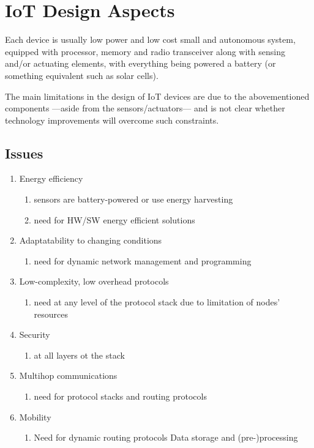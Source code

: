\chapter{IoT Design Aspects}
Each device is usually low power and low cost small and autonomous system, equipped with processor, memory and radio transceiver along with sensing and/or actuating elements, with everything being powered a battery (or something equivalent such as solar cells).

The main limitations in the design of IoT devices are due to the abovementioned components ---aside from the sensors/actuators--- and is not clear whether technology improvements will overcome such constraints.  

\section{Issues}
\begin{enumerate}
   \item Energy efficiency
   \begin{enumerate}
      \item sensors are battery-powered or use energy
      harvesting
      \item need for HW/SW energy efficient solutions
   \end{enumerate}
   \item Adaptatability to changing conditions
   \begin{enumerate}
      \item need for dynamic network management and programming
   \end{enumerate}
   \item Low-complexity, low overhead protocols
   \begin{enumerate}
      \item need at any level of the protocol stack due
      to limitation of nodes’ resources
   \end{enumerate}
   \item Security
   \begin{enumerate}
      \item at all layers ot the stack
   \end{enumerate}
   \item Multihop communications
   \begin{enumerate}
      \item need for protocol stacks and routing
      protocols
   \end{enumerate}
   \item Mobility
   \begin{enumerate}
      \item Need for dynamic routing protocols
      Data storage and (pre-)processing
   \end{enumerate}
\end{enumerate}

